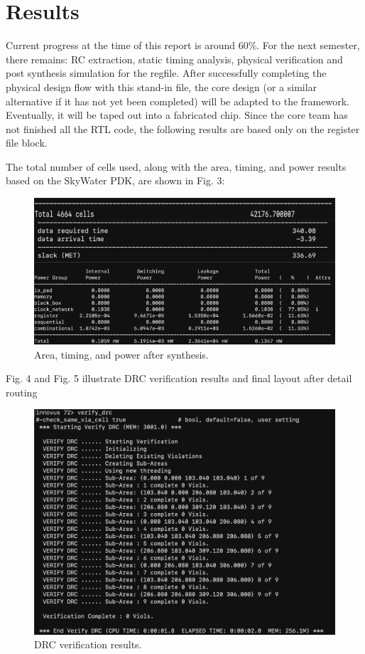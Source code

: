 \documentclass[conference]{IEEEtran}
\begin{document}
\section{Results}

Current progress at the time of this report is around 60\%. For the next semester, there remains: RC extraction, static timing analysis,  physical verification and post synthesis simulation for the regfile. After successfully completing the physical design flow with this stand-in file, the core design (or a similar alternative if it has not yet been completed) will be adapted to the framework. Eventually, it will be taped out into a fabricated chip. Since the core team has not finished all the RTL code, the following results are based only on the register file block. 


The total number of cells used, along with the area, timing, and power results based on the SkyWater PDK, are shown in Fig. 3:

\begin{figure}[htbp]
    \centering
    \includegraphics[width=\linewidth]{fig3.png} 
    \caption{Area, timing, and power after synthesis.}
    \label{fig3}
\end{figure}

Fig. 4  and Fig. 5 illustrate DRC verification results and final layout after detail routing

\begin{figure}[htbp]
    \centering
    \includegraphics[width=\linewidth]{fig4.png} 
    \caption{DRC verification results.}
    \label{fig4}
\end{figure}
\end{document}
